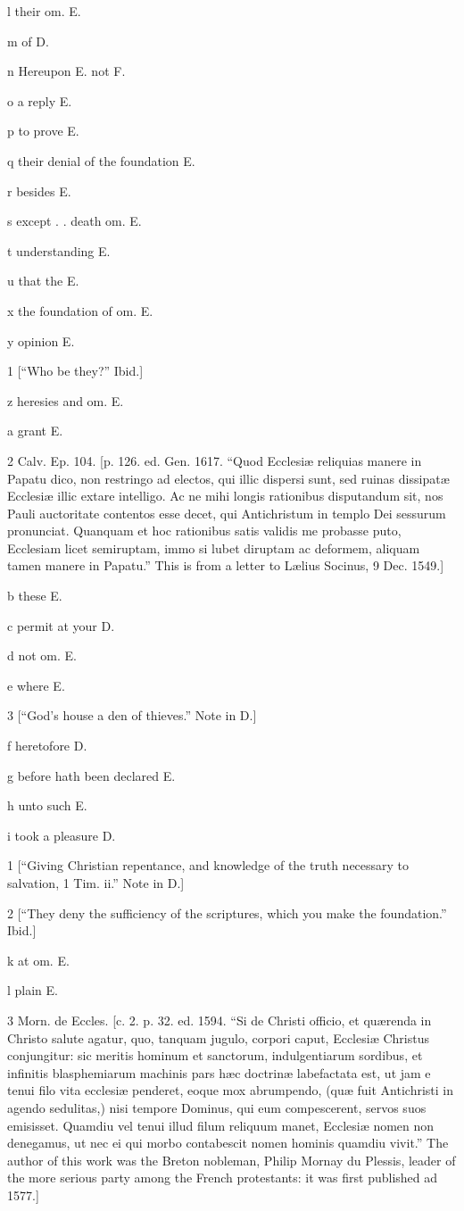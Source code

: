 l
their om. E.

m
of D.

n
Hereupon E. not F.

o
a reply E.

p
to prove E.

q
their denial of the foundation E.

r
besides E.

s
except . . death om. E.

t
understanding E.

u
that the E.

x
the foundation of om. E.

y
opinion E.

1
[“Who be they?” Ibid.]

z
heresies and om. E.

a
grant E.

2
Calv. Ep. 104. [p. 126. ed. Gen. 1617. “Quod Ecclesiæ reliquias manere in Papatu dico, non restringo ad electos, qui illic dispersi sunt, sed ruinas dissipatæ Ecclesiæ illic extare intelligo. Ac ne mihi longis rationibus disputandum sit, nos Pauli auctoritate contentos esse decet, qui Antichristum in templo Dei sessurum pronunciat. Quanquam et hoc rationibus satis validis me probasse puto, Ecclesiam licet semiruptam, immo si lubet diruptam ac deformem, aliquam tamen manere in Papatu.” This is from a letter to Lælius Socinus, 9 Dec. 1549.]

b
these E.

c
permit at your D.

d
not om. E.

e
where E.

3
[“God’s house a den of thieves.” Note in D.]

f
heretofore D.

g
before hath been declared E.

h
unto such E.

i
took a pleasure D.

1
[“Giving Christian repentance, and knowledge of the truth necessary to salvation, 1 Tim. ii.” Note in D.]

2
[“They deny the sufficiency of the scriptures, which you make the foundation.” Ibid.]

k
at om. E.

l
plain E.

3
Morn. de Eccles. [c. 2. p. 32. ed. 1594. “Si de Christi officio, et quærenda in Christo salute agatur, quo, tanquam jugulo, corpori caput, Ecclesiæ Christus conjungitur: sic meritis hominum et sanctorum, indulgentiarum sordibus, et infinitis blasphemiarum machinis pars hæc doctrinæ labefactata est, ut jam e tenui filo vita ecclesiæ penderet, eoque mox abrumpendo, (quæ fuit Antichristi in agendo sedulitas,) nisi tempore Dominus, qui eum compescerent, servos suos emisisset. Quamdiu vel tenui illud filum reliquum manet, Ecclesiæ nomen non denegamus, ut nec ei qui morbo contabescit nomen hominis quamdiu vivit.” The author of this work was the Breton nobleman, Philip Mornay du Plessis, leader of the more serious party among the French protestants: it was first published ad 1577.]

